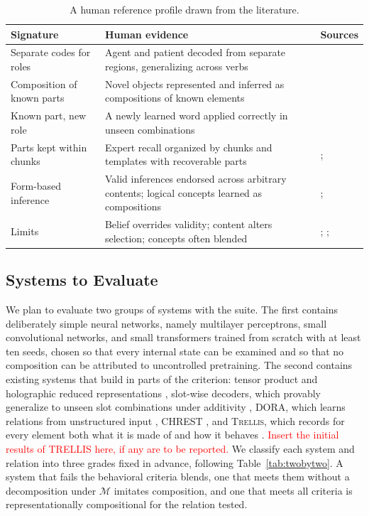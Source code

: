 \documentclass{article}
\newcommand{\note}[1]{\textcolor{red}{#1}}
\theoremstyle{definition}
\theoremstyle{plain}
\theoremstyle{remark}
\begin{document}
\begin{table}[t]
  \caption{A human reference profile drawn from the literature.}
  \label{tab:human}
  \centering\small
  \begin{tabularx}{\linewidth}{@{}P{3.3cm}YP{2.9cm}@{}}
    \toprule
    Signature & Human evidence & Sources \\
    \midrule
    Separate codes for roles & Agent and patient decoded from separate regions, generalizing across verbs & \citet{frankland2015} \\
    Composition of known parts & Novel objects represented and inferred as compositions of known elements & \citet{schwartenbeck2023} \\
    Known part, new role & A newly learned word applied correctly in unseen combinations & \citet{lake2019} \\
    Parts kept within chunks & Expert recall organized by chunks and templates with recoverable parts & \citet{chase1973}; \citet{gobet2000} \\
    Form-based inference & Valid inferences endorsed across arbitrary contents; logical concepts learned as compositions & \citet{rips1994}; \citet{piantadosi2016} \\
    Limits & Belief overrides validity; content alters selection; concepts often blended & \citet{evans1983}; \citet{wason1968}; \citet{wisniewski1997} \\
    \bottomrule
  \end{tabularx}
\end{table}

\subsection{Systems to Evaluate}

We plan to evaluate two groups of systems with the suite. The first
contains deliberately simple neural networks, namely multilayer
perceptrons, small convolutional networks, and small transformers
trained from scratch with at least ten seeds, chosen so that every
internal state can be examined and so that no composition can be
attributed to uncontrolled pretraining. The second contains existing
systems that build in parts of the criterion: tensor product and
holographic reduced representations \citep{smolensky1990,plate1995},
slot-wise decoders, which provably generalize to unseen slot
combinations under additivity \citep{wiedemer2024}, DORA, which learns
relations from unstructured input \citep{doumas2022}, CHREST
\citep{gobet2000}, and \textsc{Trellis}, which records for every element
both what it is made of and how it behaves \citep{singaravadivelan2026}.
\note{Insert the initial results of TRELLIS here, if any are to be reported.}
We classify each system and relation into three grades fixed in
advance, following Table~\ref{tab:twobytwo}. A system that fails the
behavioral criteria blends, one that meets them without a decomposition
under $\mathcal{M}$ imitates composition, and one that meets all
criteria is representationally compositional for the relation tested.
\end{document}
